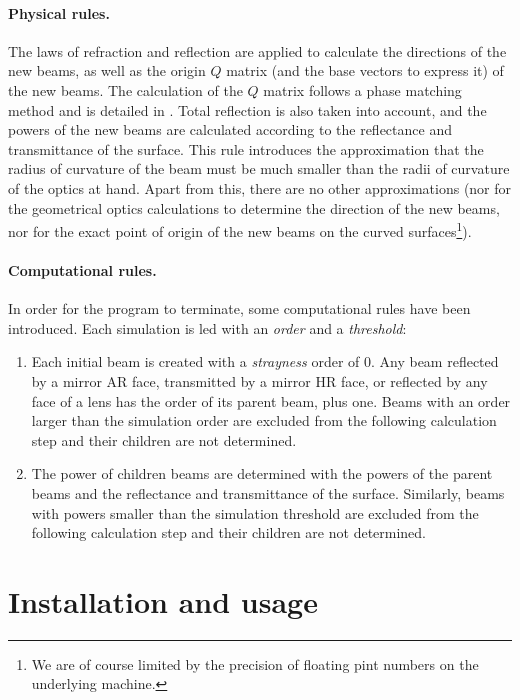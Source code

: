 \documentclass{article}
\begin{document}
\paragraph{Physical rules.}The laws of refraction and  reflection are applied to calculate the directions of the new beams, as well as the origin $Q$ matrix (and the base vectors to express it) of the new beams.  The calculation of the $Q$ matrix follows a phase matching method and is detailed in \cite{1,2}. Total reflection is also taken into account, and the powers of the new beams are calculated according to the reflectance and transmittance of the surface. This rule introduces the approximation that the radius of curvature of the beam must be much smaller than the radii of curvature of the optics at hand. Apart from this, there are no other approximations (nor for the geometrical optics calculations to determine the direction of the new beams, nor for the exact point of origin of the new beams on the curved surfaces\footnote{We are of course limited by the precision of floating pint numbers on the underlying machine.}).

\paragraph{Computational rules.}In order for the program to terminate, some computational rules have been introduced. Each simulation is led with an \textit{order} and a \textit{threshold}:

\begin{enumerate}
\item Each initial beam is created with a \textit{strayness} order of 0. Any beam reflected by a mirror AR face, transmitted by a mirror HR face, or reflected by any face of a lens has the order of its parent beam, plus one. Beams with an order larger than the simulation order are excluded from the following calculation step and their children are not determined.

\item The power of children beams are determined with the powers of the parent beams and the reflectance and transmittance of the surface. Similarly, beams with powers smaller than the simulation threshold are excluded from the following calculation step and their children are not determined.

\end{enumerate}

\section{Installation and usage}
\end{document}

